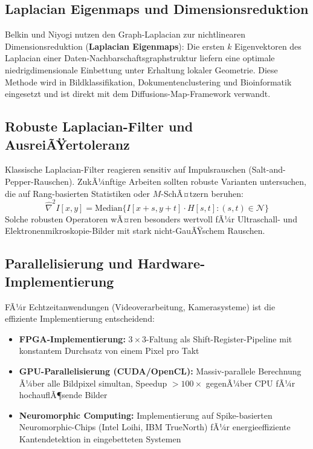 ﻿\documentclass[a4paper,12pt]{article}
\theoremstyle{definition}
\begin{document}
\subsection{Laplacian Eigenmaps und Dimensionsreduktion}

Belkin und Niyogi \cite{belkin2003} nutzen den Graph-Laplacian zur nichtlinearen Dimensionsreduktion
(\textbf{Laplacian Eigenmaps}): Die ersten $k$ Eigenvektoren des Laplacian einer Daten-Nachbarschaftsgraphstruktur
liefern eine optimale niedrigdimensionale Einbettung unter Erhaltung lokaler Geometrie. Diese Methode
wird in Bildklassifikation, Dokumentenclustering und Bioinformatik eingesetzt und ist direkt mit dem
Diffusions-Map-Framework \cite{coifman2006} verwandt.

\subsection{Robuste Laplacian-Filter und AusreiÃŸertoleranz}

Klassische Laplacian-Filter reagieren sensitiv auf Impulsrauschen (Salt-and-Pepper-Rauschen). ZukÃ¼nftige
Arbeiten sollten robuste Varianten untersuchen, die auf Rang-basierten Statistiken oder
$M$-SchÃ¤tzern beruhen:
\[
    \hat{\nabla}^2 I[x,y] = \text{Median}\bigl\{I[x+s,y+t] \cdot H[s,t] : (s,t) \in \mathcal{N}\bigr\}
\]
Solche robusten Operatoren wÃ¤ren besonders wertvoll fÃ¼r Ultraschall- und Elektronenmikroskopie-Bilder
mit stark nicht-GauÃŸschem Rauschen.

\subsection{Parallelisierung und Hardware-Implementierung}

FÃ¼r Echtzeitanwendungen (Videoverarbeitung, Kamerasysteme) ist die effiziente Implementierung
entscheidend:
\begin{itemize}
    \item \textbf{FPGA-Implementierung:} $3\times3$-Faltung als Shift-Register-Pipeline mit
          konstantem Durchsatz von einem Pixel pro Takt
    \item \textbf{GPU-Parallelisierung (CUDA/OpenCL):} Massiv-parallele Berechnung Ã¼ber alle
          Bildpixel simultan, Speedup $> 100\times$ gegenÃ¼ber CPU fÃ¼r hochauflÃ¶sende Bilder
    \item \textbf{Neuromorphic Computing:} Implementierung auf Spike-basierten Neuromorphic-Chips
          (Intel Loihi, IBM TrueNorth) fÃ¼r energieeffiziente Kantendetektion in eingebetteten Systemen
\end{itemize}
\end{document}
